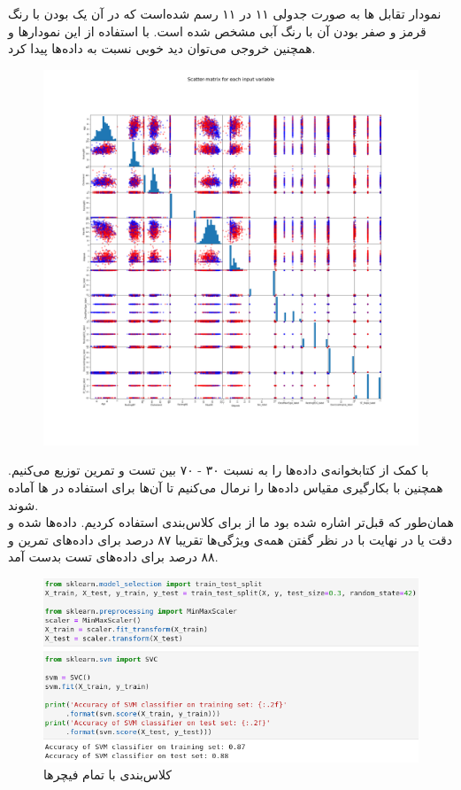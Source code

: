 \documentclass{article}
\begin{document}
\begin{multicols}{2}
نمودار تقابل
ها به صورت جدولی ۱۱ در ۱۱ رسم شده‌است که در آن یک بودن
با رنگ قرمز و صفر بودن آن با رنگ آبی مشخص شده است. با استفاده از این نمودارها و همچنین خروجی
می‌توان دید خوبی نسبت به داده‌ها پیدا کرد.
\begin{figure}[H]
    \centering
    \includegraphics[width=0.99\linewidth]{Photos/SA/scatter_matrix.png}
    \caption{
    }
    \label{fig:my_label}
\end{figure}

با کمک
از کتابخوانه‌ی
داده‌ها را به نسبت ۳۰ - ۷۰ بین تست و تمرین توزیع می‌کنیم. همچنین با بکارگیری
مقیاس داده‌ها را نرمال می‌کنیم تا آن‌ها برای استفاده در
ها آماده شوند.\\
همان‌طور که قبل‌تر اشاره شده بود ما از
برای کلاس‌بندی استفاده کردیم. داده‌ها 
شده و دقت یا 
در نهایت با در نظر گفتن همه‌ی ویژگی‌ها تقریبا ۸۷ درصد برای داده‌های تمرین و ۸۸ درصد برای داده‌های تست بدست آمد.
\begin{figure}[H]
    \centering
    \includegraphics[width=0.99\linewidth]{Photos/SA/learning.png}
    \caption{
    کلاس‌بندی با تمام فیچرها
    }
    \label{fig:my_label}
\end{figure}


\end{multicols}
\end{document}

